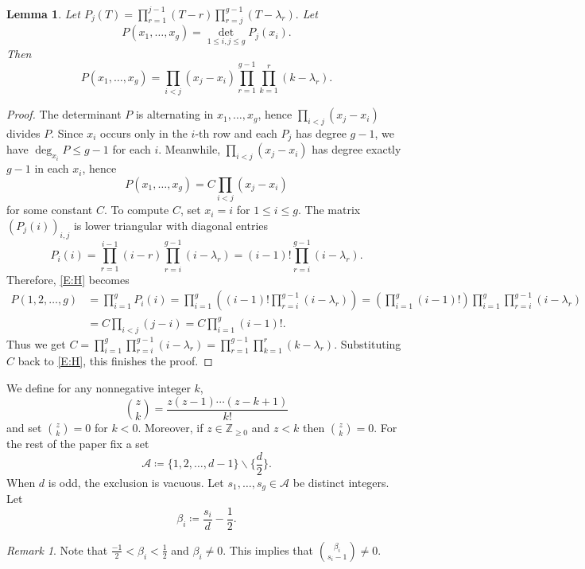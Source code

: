 \documentclass{amsart}
\theoremstyle{plain}
\newtheorem{lemma}[theorem]{Lemma}
\theoremstyle{remark}
\newtheorem{remark}[theorem]{Remark}
\theoremstyle{remark}
\newcommand{\cA}{\mathcal{A}}
\newcommand{\0}{\mathbf{0}}
\newcommand{\1}{\mathbf{1}}
\newcommand{\Z}{\mathbb{Z}}
\begin{document}
\begin{lemma}\label{L:product}
Let $
P_j(T)
=
\prod_{r=1}^{j-1}(T-r)
\prod_{r=j}^{g-1}(T-\lambda_r).$
Let
$$
P(x_1,\dots,x_g)=
\det_{1\le i,j\le g} P_j(x_i).
$$
Then 
\[
P(x_1,\dots,x_g)=
\displaystyle \prod_{i<j}(x_j-x_i)
\displaystyle \prod_{r=1}^{g-1}\prod_{k=1}^r
(k-\lambda_r).\]
\end{lemma}

\begin{proof} 
The determinant $P$ is alternating in $x_1,\ldots,x_g$,
hence $\prod_{i<j}(x_j-x_i)$ divides $P$.
Since $x_i$ occurs only in the $i$-th row and each $P_j$ has degree $g-1$, we have 
$\deg_{x_i}P\le g-1$ for each $i$.
Meanwhile, $\prod_{i<j}(x_j-x_i)$ has degree exactly $g-1$ in each $x_i$, 
hence 
\begin{equation}\label{E:H}
P(x_1,\dots,x_g)
=
C\prod_{i<j}(x_j-x_i)
\end{equation}
for some constant $C$.
To compute $C$, set $x_i=i$ for $1\le i\le g$. 
The matrix $(P_j(i))_{i,j}$ is lower triangular with diagonal entries
\[
P_i(i)
=
\prod_{r=1}^{i-1}(i-r)
\prod_{r=i}^{g-1}(i-\lambda_r)
=
(i-1)!\prod_{r=i}^{g-1}(i-\lambda_r).
\]
Therefore, \eqref{E:H} becomes
\begin{align*}
P(1,2,\dots,g)
&=\prod_{i=1}^{g}P_i(i)=
\prod_{i=1}^g\left(
(i-1)!\prod_{r=i}^{g-1}(i-\lambda_r)\right)
=
\left(\prod_{i=1}^g(i-1)!\right)
\prod_{i=1}^{g}\prod_{r=i}^{g-1}(i-\lambda_r)
\\
&=
C\prod_{i<j}(j-i)=C\prod_{i=1}^g(i-1)!.
\end{align*}
Thus we get
$
C
=
\prod_{i=1}^g\prod_{r=i}^{g-1}(i-\lambda_r)
=
\prod_{r=1}^{g-1}\prod_{k=1}^r(k-\lambda_r).
$
Substituting $C$ back to \eqref{E:H}, this finishes the proof.
\end{proof}

We define for any nonnegative integer $k$,
$$
\binom{z}{k}=\frac{z(z-1)\cdots (z-k+1)}{k!}
$$
and set $\binom{z}{k}=0$ for $k<0$. 
Moreover, if $z\in\Z_{\ge 0}$ and $z<k$ then $\binom{z}{k}=0$.
For the rest of the paper 
fix a set
$$\cA \coloneqq\{1,2,\ldots,d-1\}\backslash \{\frac{d}{2}\}.$$
When $d$ is odd, the exclusion is vacuous.
Let $s_1,\ldots,s_g\in\cA$ be distinct integers.
Let 
\begin{equation}\label{E:alpha}
\beta_i\coloneqq\frac{s_i}{d}-\frac12.
\end{equation}

\begin{remark}\label{R:binom}
Note that $\frac{-1}{2}<\beta_i<\frac12$ and $\beta_i\ne 0$.
This implies that $\binom{\beta_i}{s_i-1}\ne 0$.
\end{remark}
\end{document}
